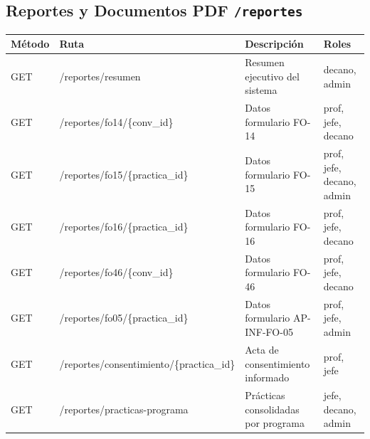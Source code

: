 \documentclass[12pt,a4paper]{article}
\begin{document}
\subsection{Reportes y Documentos PDF \texttt{/reportes}}
\begin{longtable}{>{\ttfamily}p{1.5cm} >{\ttfamily}p{6cm} p{4.5cm} p{2cm}}
  \toprule
  \textbf{Método} & \textbf{Ruta} & \textbf{Descripción} & \textbf{Roles} \\
  \midrule
  GET    & /reportes/resumen & Resumen ejecutivo del sistema & decano, admin \\
  GET    & /reportes/fo14/\{conv\_id\} & Datos formulario FO-14 & prof, jefe, decano \\
  GET    & /reportes/fo15/\{practica\_id\} & Datos formulario FO-15 & prof, jefe, decano, admin \\
  GET    & /reportes/fo16/\{practica\_id\} & Datos formulario FO-16 & prof, jefe, decano \\
  GET    & /reportes/fo46/\{conv\_id\} & Datos formulario FO-46 & prof, jefe, decano \\
  GET    & /reportes/fo05/\{practica\_id\} & Datos formulario AP-INF-FO-05 & prof, jefe, admin \\
  GET    & /reportes/consentimiento/\{practica\_id\} & Acta de consentimiento informado & prof, jefe \\
  GET    & /reportes/practicas-programa & Prácticas consolidadas por programa & jefe, decano, admin \\
  \bottomrule
\end{longtable}

\end{document}
